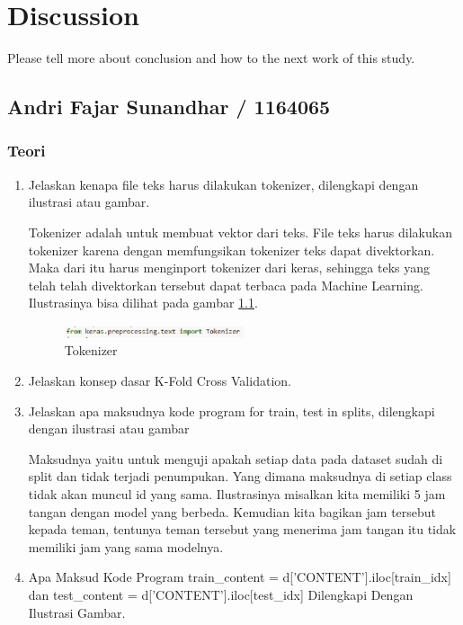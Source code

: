 \chapter{Discussion}
Please tell more about conclusion and how to the next work of this study.

\section{Andri Fajar Sunandhar / 1164065}
\subsection{Teori}
\begin{enumerate}

\item Jelaskan kenapa file teks harus dilakukan tokenizer, dilengkapi dengan ilustrasi atau gambar.
	\par Tokenizer adalah untuk membuat vektor dari teks. File teks harus dilakukan tokenizer karena dengan memfungsikan tokenizer teks dapat divektorkan. Maka dari itu harus menginport tokenizer dari keras, sehingga teks yang telah telah divektorkan tersebut dapat terbaca pada Machine Learning. Ilustrasinya bisa dilihat pada gambar \ref{no1}.
	\begin{figure}[ht]
	\centerline{\includegraphics[width=0.5\textwidth]{figures/chapter7/no1.jpg}}
	\caption{Tokenizer}
	\label{no1}
	\end{figure}

\item Jelaskan konsep dasar K-Fold Cross Validation.

\item Jelaskan apa maksudnya kode program for train, test in splits, dilengkapi dengan ilustrasi atau gambar
	\par Maksudnya yaitu untuk menguji apakah setiap data pada dataset sudah di split dan tidak terjadi penumpukan. Yang dimana maksudnya di setiap class tidak akan muncul id yang sama. Ilustrasinya misalkan kita memiliki 5 jam tangan dengan model yang berbeda. Kemudian kita bagikan jam tersebut kepada teman, tentunya teman tersebut yang menerima jam tangan itu tidak memiliki jam yang sama modelnya.
 

\item Apa Maksud Kode Program train\_content = d['CONTENT'].iloc[train\_idx] dan test\_content = d['CONTENT'].iloc[test\_idx] Dilengkapi Dengan Ilustrasi Gambar.


\end{enumerate}
